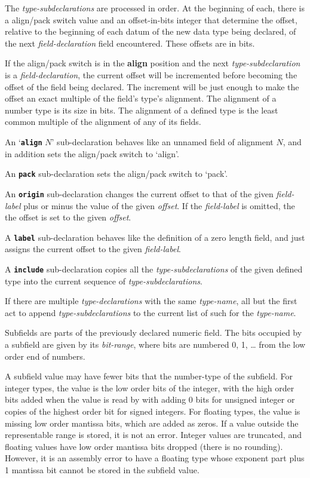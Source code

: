 \documentclass[12pt]{article}
\newcommand{\key}[1]{{\rm \bfseries #1}}
\newcommand{\ttkey}[1]{{\tt \bfseries #1}}
\begin{document}
The {\em type-subdeclarations} are processed in order.  At the
beginning of each, there is a align/pack switch value and an
offset-in-bits integer that determine the offset, relative to the
beginning of each datum of the new data type being declared, of the next
{\em field-declaration} field encountered.  These offsets are in bits.

If the align/pack switch is in the \key{align} position and the
next {\em type-subdeclaration} is a {\em field-declaration}, the
current offset will be incremented before becoming the offset
of the field being declared.  The increment will be just enough
to make the offset an exact multiple of the field's type's alignment.
The alignment of a number type is its size in bits.  The alignment
of a defined type is the least common multiple of the alignment of
any of its fields.

An `\ttkey{align} $N$' sub-declaration behaves like an unnamed
field of alignment $N$, and in addition sets the align/pack switch
to `align'.

An \ttkey{pack} sub-declaration sets the align/pack switch to `pack'.

An \ttkey{origin} sub-declaration changes the current offset to that
of the given {\em field-label} plus or minus the value of the
given {\em offset}.  If the {\em field-label} is omitted, the
the offset is set to the given {\em offset}.

A \ttkey{label} sub-declaration behaves like the definition of a
zero length field, and just assigns the current offset to the
given {\em field-label}.

A \ttkey{include} sub-declaration copies all the {\em type-subdeclarations}
of the given defined type into the current sequence of
{\em type-subdeclarations}.

If there are multiple {\em type-declarations} with the same
{\em type-name}, all but the first act to append {\em type-subdeclarations}
to the current list of such for the {\em type-name}.

Subfields are parts of the previously declared numeric field.
The bits occupied
by a subfield are given by its {\em bit-range}, where bits are numbered
0, 1, \ldots{} from the low order end of numbers.

A subfield value may have fewer bits that the number-type of the subfield.
For integer types, the value is the low order bits of the integer, with
the high order bits added when the value is read by with adding 0 bits
for unsigned integer or copies of the highest order bit for signed integers.
For floating types, the value is missing low order mantissa bits, which
are added as zeros.  If a value outside the representable range is stored,
it is not an error.  Integer values are truncated, and floating values
have low order mantissa bits dropped (there is no rounding).  However, it is
an assembly error to have a floating type whose exponent part plus
1 mantissa bit cannot be stored in the subfield value.
\end{document}
